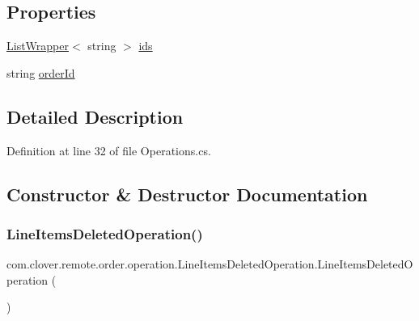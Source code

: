 \subsection*{Properties}
\begin{DoxyCompactItemize}
\item 
\hyperlink{classcom_1_1clover_1_1remote_1_1order_1_1_list_wrapper}{List\+Wrapper}$<$ string $>$ \hyperlink{classcom_1_1clover_1_1remote_1_1order_1_1operation_1_1_line_items_deleted_operation_a5e098dd131dd1b5900c7d4d608dd1e31}{ids}
\item 
string \hyperlink{classcom_1_1clover_1_1remote_1_1order_1_1operation_1_1_line_items_deleted_operation_a23db6d8c7b059e21bbda7ad5c97e83c1}{order\+Id}
\end{DoxyCompactItemize}


\subsection{Detailed Description}


Definition at line 32 of file Operations.\+cs.



\subsection{Constructor \& Destructor Documentation}
\mbox{\label{classcom_1_1clover_1_1remote_1_1order_1_1operation_1_1_line_items_deleted_operation_a0d25697ca76a84497704a664f4e684c6}} 
\subsubsection{\texorpdfstring{Line\+Items\+Deleted\+Operation()}{LineItemsDeletedOperation()}\hspace{0.1cm}{\footnotesize\ttfamily [1/2]}}
{\footnotesize\ttfamily com.\+clover.\+remote.\+order.\+operation.\+Line\+Items\+Deleted\+Operation.\+Line\+Items\+Deleted\+Operation (\begin{DoxyParamCaption}{ }\end{DoxyParamCaption})}



